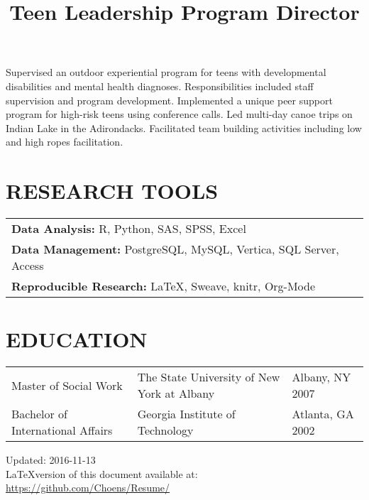 \documentclass[line, margin, 10pt]{res}
\begin{document}
\begin{resume}
  \title{Teen Leadership Program Director}
  \begin{position}
    Supervised an outdoor experiential program for teens with
    developmental disabilities and mental health
    diagnoses. Responsibilities included staff supervision and program
    development. Implemented a unique peer support program for
    high-risk teens using conference calls. Led multi-day canoe trips
    on Indian Lake in the Adirondacks. Facilitated team building
    activities including low and high ropes facilitation.
  \end{position}

  \section{RESEARCH TOOLS}

  \begin{tabular} {l l}
    {\bf Data Analysis:} R, Python, SAS, SPSS, Excel\\
    {\bf Data Management:} PostgreSQL, MySQL, Vertica, SQL Server, Access\\
    {\bf Reproducible Research:} \LaTeX, Sweave, knitr, Org-Mode\\
  \end{tabular}

  \section{EDUCATION}
  \begin{tabular} {p{1.5in} p{2.125in} p{.75in}}
    Master of Social Work & The State University of New  York at Albany & Albany, NY 2007 \\
    Bachelor of International Affairs & Georgia Institute of
    Technology & Atlanta, GA 2002 
  \end{tabular}

  \vspace{.25in}
  Updated: 2016-11-13 \\
  \LaTeX version of this document available at:
  \href{https://github.com/Choens/Resume/}{https://github.com/Choens/Resume/}

  \vspace{.125in} 

\end{resume}
\end{document}
